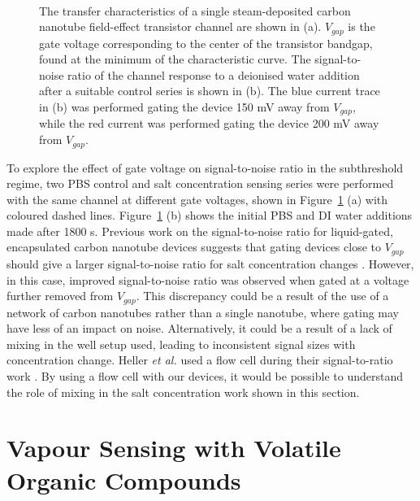 \documentclass[
  a4paper,
]{scrbook}
\begin{document}
\begin{figure}
\begin{minipage}[t]{0.57\linewidth}
{{}

}

\end{minipage}%
%
\begin{minipage}[t]{0.19\linewidth}

{\centering 

~

}

\end{minipage}%

\caption{\label{fig-salt-conc-SNR}The transfer characteristics of a
single steam-deposited carbon nanotube field-effect transistor channel
are shown in (a). \(V_{gap}\) is the gate voltage corresponding to the
center of the transistor bandgap, found at the minimum of the
characteristic curve. The signal-to-noise ratio of the channel response
to a deionised water addition after a suitable control series is shown
in (b). The blue current trace in (b) was performed gating the device
150 mV away from \(V_{gap}\), while the red current was performed gating
the device 200 mV away from \(V_{gap}\).}

\end{figure}

To explore the effect of gate voltage on signal-to-noise ratio in the
subthreshold regime, two PBS control and salt concentration sensing
series were performed with the same channel at different gate voltages,
shown in Figure~\ref{fig-salt-conc-SNR} (a) with coloured dashed lines.
Figure~\ref{fig-salt-conc-SNR} (b) shows the initial PBS and DI water
additions made after 1800 s. Previous work on the signal-to-noise ratio
for liquid-gated, encapsulated carbon nanotube devices suggests that
gating devices close to \(V_{gap}\) should give a larger signal-to-noise
ratio for salt concentration changes \autocite{Heller2009}. However, in
this case, improved signal-to-noise ratio was observed when gated at a
voltage further removed from \(V_{gap}\). This discrepancy could be a
result of the use of a network of carbon nanotubes rather than a single
nanotube, where gating may have less of an impact on noise.
Alternatively, it could be a result of a lack of mixing in the well
setup used, leading to inconsistent signal sizes with concentration
change. Heller \emph{et al.} used a flow cell during their
signal-to-ratio work \autocite{Heller2009}. By using a flow cell with
our devices, it would be possible to understand the role of mixing in
the salt concentration work shown in this section.

\hypertarget{sec-pristine-EtHex}{%
\section{Vapour Sensing with Volatile Organic
Compounds}\label{sec-pristine-EtHex}}
\end{document}
